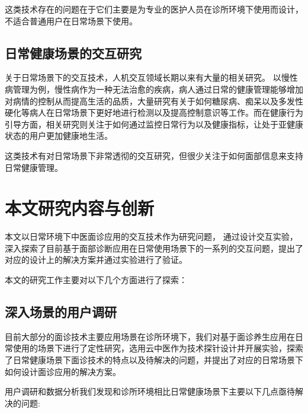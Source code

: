 这类技术存在的问题在于它们主要是为专业的医护人员在诊所环境下使用而设计，不适合普通用户在日常场景下使用。

\subsection{日常健康场景的交互研究}
关于日常场景下的交互技术，人机交互领域长期以来有大量的相关研究。
以慢性病管理为例，慢性病作为一种无法治愈的疾病，病人通过日常的健康管理能够增加对病情的控制从而提高生活的品质，大量研究有关于如何糖尿病\cite{mamykina2008mahi}、痴呆\cite{yasuda2009remote}以及多发性硬化\cite{ayobi2017quantifying}等病人在日常场景下更好地进行检测以及提高控制意识等工作。而在健康行为引导方面，相关研究则关注于如何通过监控日常行为\cite{purpura2011fit4life,Inagawa2013A,bravata2007using,cordeiro2015barriers,lin2006fish, miller2014stepstream}以及健康指标\cite{kay2012lullaby,gronvall2013beyond,logan2007mobile,walters2010a}，让处于亚健康状态的用户更加健康地生活。

这类技术有对日常场景下非常透彻的交互研究，但很少关注于如何面部信息来支持日常健康管理。


\section{本文研究内容与创新}

本文以日常环境下中医面诊应用的交互技术作为研究问题，
通过设计交互实验，深入探索了目前基于面部诊断应用在日常使用场景下的一系列的交互问题，提出了对应的设计上的解决方案并通过实验进行了验证。

本文的研究工作主要对以下几个方面进行了探索：

\subsection{深入场景的用户调研}

目前大部分的面诊技术主要应用场景在诊所环境下，我们对基于面诊养生应用在日常使用的场景下进行了定性研究，选用云中医作为技术探针设计并开展实验，探索了日常健康场景下面诊技术的特点以及待解决的问题，并提出了对应的日常场景下如何设计面诊应用的解决方案。

用户调研和数据分析我们发现和诊所环境相比日常健康场景下主要以下几点亟待解决的问题: 

